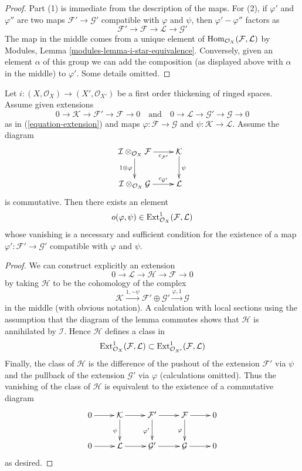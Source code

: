 \begin{proof}
Part (1) is immediate from the description of the maps.
For (2), if $\varphi'$ and $\varphi''$ are two maps
$\mathcal{F}' \to \mathcal{G}'$ compatible with $\varphi$
and $\psi$, then $\varphi' - \varphi''$ factors as
$$
\mathcal{F}' \to \mathcal{F} \to \mathcal{L} \to \mathcal{G}'
$$
The map in the middle comes from a unique element of
$\mathop{\mathrm{Hom}}\nolimits_{\mathcal{O}_X}(\mathcal{F}, \mathcal{L})$ by
Modules, Lemma \ref{modules-lemma-i-star-equivalence}.
Conversely, given an element $\alpha$ of this group we can add the
composition (as displayed above with $\alpha$ in the middle)
to $\varphi'$. Some details omitted.
\end{proof}

\begin{lemma}
\label{lemma-inf-obs-map}
Let $i : (X, \mathcal{O}_X) \to (X', \mathcal{O}_{X'})$
be a first order thickening of ringed spaces. Assume given
extensions
$$
0 \to \mathcal{K} \to \mathcal{F}' \to \mathcal{F} \to 0
\quad\text{and}\quad
0 \to \mathcal{L} \to \mathcal{G}' \to \mathcal{G} \to 0
$$
as in (\ref{equation-extension})
and maps $\varphi : \mathcal{F} \to \mathcal{G}$ and
$\psi : \mathcal{K} \to \mathcal{L}$. Assume the diagram
$$
\xymatrix{
\mathcal{I} \otimes_{\mathcal{O}_X} \mathcal{F}
\ar[r]_-{c_{\mathcal{F}'}} \ar[d]_{1 \otimes \varphi} &
\mathcal{K} \ar[d]^\psi \\
\mathcal{I} \otimes_{\mathcal{O}_X} \mathcal{G}
\ar[r]^-{c_{\mathcal{G}'}} &
\mathcal{L}
}
$$
is commutative. Then there exists an element
$$
o(\varphi, \psi) \in
\mathop{\mathrm{Ext}}\nolimits^1_{\mathcal{O}_X}(\mathcal{F}, \mathcal{L})
$$
whose vanishing is a necessary and sufficient condition for the existence
of a map $\varphi' : \mathcal{F}' \to \mathcal{G}'$ compatible with
$\varphi$ and $\psi$.
\end{lemma}

\begin{proof}
We can construct explicitly an extension
$$
0 \to \mathcal{L} \to \mathcal{H} \to \mathcal{F} \to 0
$$
by taking $\mathcal{H}$ to be the cohomology of the complex
$$
\mathcal{K}
\xrightarrow{1, - \psi}
\mathcal{F}' \oplus \mathcal{G}' \xrightarrow{\varphi, 1}
\mathcal{G}
$$
in the middle (with obvious notation). A calculation with local sections
using the assumption that the diagram of the lemma commutes
shows that $\mathcal{H}$ is annihilated by $\mathcal{I}$. Hence
$\mathcal{H}$ defines a class in
$$
\mathop{\mathrm{Ext}}\nolimits^1_{\mathcal{O}_X}(\mathcal{F}, \mathcal{L})
\subset
\mathop{\mathrm{Ext}}\nolimits^1_{\mathcal{O}_{X'}}(\mathcal{F}, \mathcal{L})
$$
Finally, the class of $\mathcal{H}$ is the difference of the pushout
of the extension $\mathcal{F}'$ via $\psi$ and the pullback
of the extension $\mathcal{G}'$ via $\varphi$ (calculations omitted).
Thus the vanishing of the class of $\mathcal{H}$ is equivalent to the
existence of a commutative diagram
$$
\xymatrix{
0 \ar[r] &
\mathcal{K} \ar[r] \ar[d]_{\psi} &
\mathcal{F}' \ar[r] \ar[d]_{\varphi'} &
\mathcal{F} \ar[r] \ar[d]_\varphi & 0\\
0 \ar[r] &
\mathcal{L} \ar[r] &
\mathcal{G}' \ar[r] &
\mathcal{G} \ar[r] & 0
}
$$
as desired.
\end{proof}

